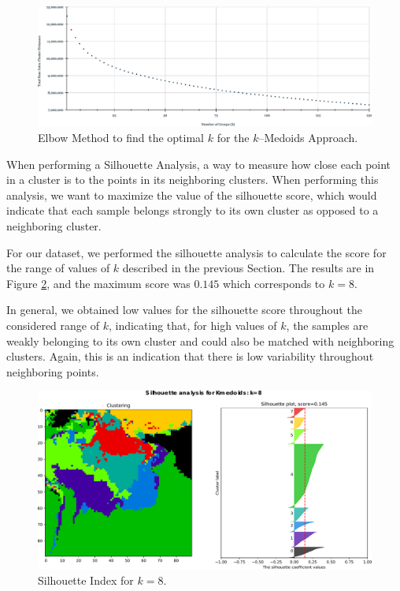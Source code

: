 \begin{figure}[h]
	\centering
	\includegraphics[scale=0.5]{../Figures/Elbow-Kmedoids}
	\caption{Elbow Method to find the optimal $k$ for the $k$--Medoids Approach.}
	\label{Fig:SSE-kMedoids}
\end{figure}

When performing a Silhouette Analysis, a way to measure how close each point in a cluster is to the points in its neighboring clusters. When performing this analysis, we want to maximize the value of the silhouette score, which would indicate that each sample belongs strongly to its own cluster as opposed to a neighboring cluster.

For our dataset, we performed the silhouette analysis to calculate the score for the range of values of $k$ described in the previous Section. The results are in Figure \ref{Fig:Silhouette-kMedoids}, and the maximum score was $0.145$ which corresponds to $k = 8$. 

In general, we obtained low values for the silhouette score throughout the considered range of $k$, indicating that, for high values of $k$, the samples are weakly belonging to its own cluster and could also be matched with neighboring clusters. Again, this is an indication that there is low variability throughout neighboring points.

\begin{figure}[h]
	\centering
	\includegraphics[scale=0.50]{../Figures/silhouette-kmedoids_k8_seed0_lite}
	\caption{Silhouette Index for $k=8$.}
	\label{Fig:Silhouette-kMedoids}
\end{figure}

